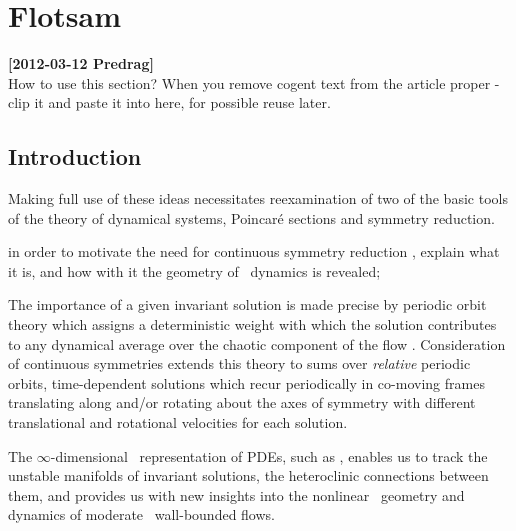 
\section{Flotsam}
\label{s:flotsam}

\noindent
{\bf [2012-03-12 Predrag]}
\\
How to use this section? When you remove cogent text from the article
proper - clip  it and paste it into here, for possible reuse later.

\subsection{Introduction}
\label{s:introFlot}

Making full use of these ideas necessitates reexamination of two of the
basic tools of the theory of dynamical systems, Poincar\'e sections and
symmetry reduction.

    in order to motivate the need for continuous symmetry reduction , explain
    what it is, and how with it the geometry of \statesp\ dynamics is revealed;


The importance of a given invariant solution is made precise by periodic
orbit theory which assigns a deterministic weight with which the solution
contributes to any dynamical average over the chaotic component of the
flow . Consideration of continuous symmetries extends this
theory to sums over \emph{relative} periodic orbits,
time-dependent solutions which recur periodically in co-moving frames
translating along and/or rotating about the axes of symmetry with
different translational and rotational velocities for each solution.

The $\infty$-dimensional \stateDsp\
representation of PDEs, such as ,
enables us to track the unstable manifolds of invariant
solutions, the heteroclinic connections between them, and
{provides us with} new insights into the nonlinear \statesp\ geometry and
dynamics of moderate \Reynolds\ wall-bounded flows.

